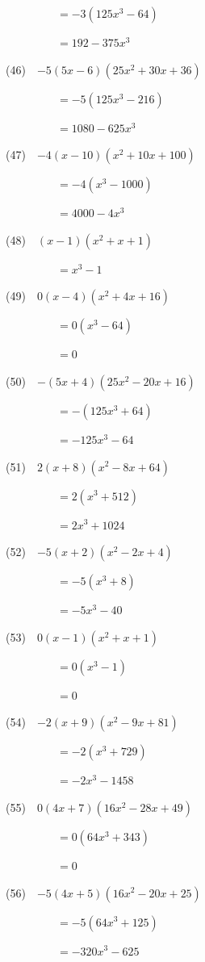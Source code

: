 \documentclass[a4j,twocolumn,10pt,fleqn]{jarticle}
\begin{document}
~~~~~~~~~$=-3(125 x^{3} - 64)$

~~~~~~~~~$=192 - 375 x^{3}$

(46)~~$-5\left(5 x - 6\right) \left(25 x^{2} + 30 x + 36\right)$

~~~~~~~~~$=-5(125 x^{3} - 216)$

~~~~~~~~~$=1080 - 625 x^{3}$

(47)~~$-4\left(x - 10\right) \left(x^{2} + 10 x + 100\right)$

~~~~~~~~~$=-4(x^{3} - 1000)$

~~~~~~~~~$=4000 - 4 x^{3}$

(48)~~$\left(x - 1\right) \left(x^{2} + x + 1\right)$

~~~~~~~~~$=x^{3} - 1$

(49)~~$0\left(x - 4\right) \left(x^{2} + 4 x + 16\right)$

~~~~~~~~~$=0(x^{3} - 64)$

~~~~~~~~~$=0$

(50)~~$-\left(5 x + 4\right) \left(25 x^{2} - 20 x + 16\right)$

~~~~~~~~~$=-(125 x^{3} + 64)$

~~~~~~~~~$=- 125 x^{3} - 64$

(51)~~$2\left(x + 8\right) \left(x^{2} - 8 x + 64\right)$

~~~~~~~~~$=2(x^{3} + 512)$

~~~~~~~~~$=2 x^{3} + 1024$

(52)~~$-5\left(x + 2\right) \left(x^{2} - 2 x + 4\right)$

~~~~~~~~~$=-5(x^{3} + 8)$

~~~~~~~~~$=- 5 x^{3} - 40$

(53)~~$0\left(x - 1\right) \left(x^{2} + x + 1\right)$

~~~~~~~~~$=0(x^{3} - 1)$

~~~~~~~~~$=0$

(54)~~$-2\left(x + 9\right) \left(x^{2} - 9 x + 81\right)$

~~~~~~~~~$=-2(x^{3} + 729)$

~~~~~~~~~$=- 2 x^{3} - 1458$

(55)~~$0\left(4 x + 7\right) \left(16 x^{2} - 28 x + 49\right)$

~~~~~~~~~$=0(64 x^{3} + 343)$

~~~~~~~~~$=0$

(56)~~$-5\left(4 x + 5\right) \left(16 x^{2} - 20 x + 25\right)$

~~~~~~~~~$=-5(64 x^{3} + 125)$

~~~~~~~~~$=- 320 x^{3} - 625$
\end{document}
